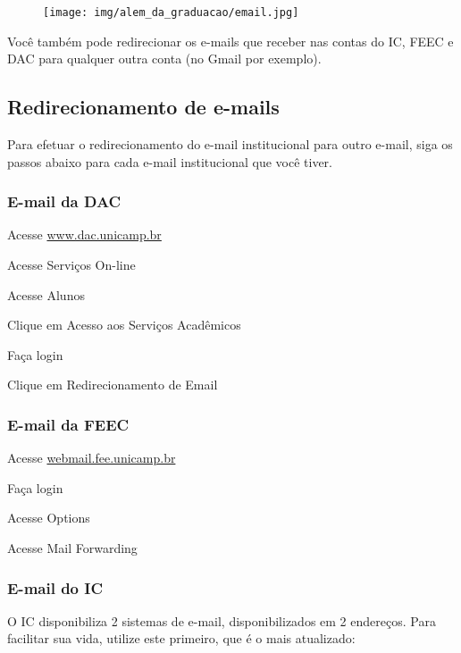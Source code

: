 \begin{figure}[b!]
    \centering
    \texttt{[image: img/alem\_da\_graduacao/email.jpg]}
\end{figure}

Você também pode redirecionar os e-mails que receber nas contas do IC, FEEC e
DAC para qualquer outra conta (no Gmail por exemplo).

\subsection{Redirecionamento de e-mails}
Para efetuar o redirecionamento do e-mail institucional para outro e-mail, siga
os passos abaixo para cada e-mail institucional que você tiver.

\subsubsection{E-mail da DAC}

\begin{compactenumerate}
    \item  Acesse \url{www.dac.unicamp.br}
    \item  Acesse Serviços On-line
    \item  Acesse Alunos
    \item  Clique em Acesso aos Serviços Acadêmicos
    \item  Faça login
    \item  Clique em Redirecionamento de Email
\end{compactenumerate}

\subsubsection{E-mail da FEEC}

\begin{compactenumerate}
    \item  Acesse \url{webmail.fee.unicamp.br}
    \item  Faça login
    \item  Acesse Options
    \item  Acesse Mail Forwarding
\end{compactenumerate}

\subsubsection{E-mail do IC}

O IC disponibiliza 2 sistemas de e-mail, disponibilizados em 2 endereços. Para
facilitar sua vida, utilize este primeiro, que é o mais atualizado:

